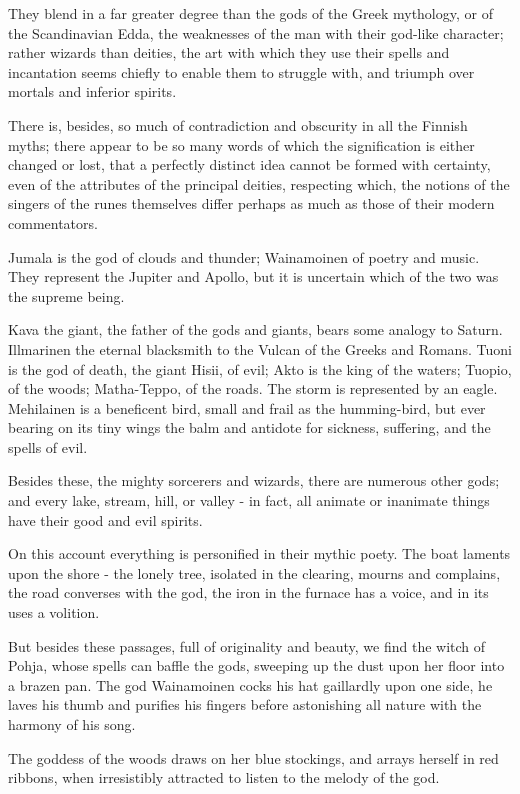 \documentclass[10pt,a4paper]{article}
\begin{document}
They blend in a far greater degree than the gods of the Greek mythology, or of the Scandinavian Edda, the weaknesses of the man with their god-like character; rather wizards than deities, the art with which they use their spells and incantation seems chiefly to enable them to struggle with, and triumph over mortals and inferior spirits.

There is, besides, so much of contradiction and obscurity in all the Finnish myths; there appear to be so many words of which the signification is either changed or lost, that a perfectly distinct idea cannot be formed with certainty, even of the attributes of the principal deities, respecting which, the notions of the singers of the runes themselves differ perhaps as much as those of their modern commentators.

Jumala is the god of clouds and thunder; Wainamoinen of poetry and music. They represent the Jupiter and Apollo, but it is uncertain which of the two was the supreme being.

Kava the giant, the father of the gods and giants, bears some analogy to Saturn. Illmarinen the eternal blacksmith to the Vulcan of the Greeks and Romans. Tuoni is the god of death, the giant Hisii, of evil; Akto is the king of the waters; Tuopio, of the woods; Matha-Teppo, of the roads. The storm is represented by an eagle. Mehilainen is a beneficent bird, small and frail as the humming-bird, but ever bearing on its tiny wings the balm and antidote for sickness, suffering, and the spells of evil.

Besides these, the mighty sorcerers and wizards, there are numerous other gods; and every lake, stream, hill, or valley - in fact, all animate or inanimate things have their good and evil spirits.

On this account everything is personified in their mythic poety. The boat laments upon the shore - the lonely tree, isolated in the clearing, mourns and complains, the road converses with the god, the iron in the furnace has a voice, and in its uses a volition.

But besides these passages, full of originality and beauty, we find the witch of Pohja, whose spells can baffle the gods, sweeping up the dust upon her floor into a brazen pan. The god Wainamoinen cocks his hat gaillardly upon one side, he laves his thumb and purifies his fingers before astonishing all nature with the harmony of his song.

The goddess of the woods draws on her blue stockings, and arrays herself in red ribbons, when irresistibly attracted to listen to the melody of the god.
\end{document}
